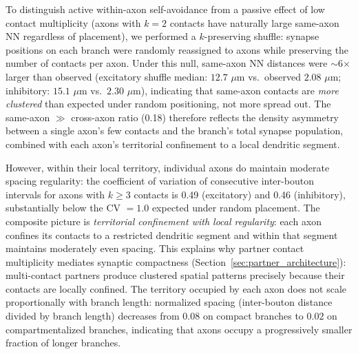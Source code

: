\documentclass[11pt]{article}
\begin{document}
To distinguish active within-axon self-avoidance from a passive effect of low contact multiplicity (axons with $k = 2$ contacts have naturally large same-axon NN regardless of placement), we performed a $k$-preserving shuffle: synapse positions on each branch were randomly reassigned to axons while preserving the number of contacts per axon. Under this null, same-axon NN distances were $\sim$6$\times$ larger than observed (excitatory shuffle median: $12.7$ $\mu$m vs.\ observed $2.08$ $\mu$m; inhibitory: $15.1$ $\mu$m vs.\ $2.30$ $\mu$m), indicating that same-axon contacts are \textit{more clustered} than expected under random positioning, not more spread out. The same-axon $\gg$ cross-axon ratio (0.18) therefore reflects the density asymmetry between a single axon's few contacts and the branch's total synapse population, combined with each axon's territorial confinement to a local dendritic segment.

However, within their local territory, individual axons do maintain moderate spacing regularity: the coefficient of variation of consecutive inter-bouton intervals for axons with $k \geq 3$ contacts is 0.49 (excitatory) and 0.46 (inhibitory), substantially below the CV $= 1.0$ expected under random placement. The composite picture is \textit{territorial confinement with local regularity}: each axon confines its contacts to a restricted dendritic segment and within that segment maintains moderately even spacing. This explains why partner contact multiplicity mediates synaptic compactness (Section~\ref{sec:partner_architecture}): multi-contact partners produce clustered spatial patterns precisely because their contacts are locally confined. The territory occupied by each axon does not scale proportionally with branch length: normalized spacing (inter-bouton distance divided by branch length) decreases from $0.08$ on compact branches to $0.02$ on compartmentalized branches, indicating that axons occupy a progressively smaller fraction of longer branches.
\end{document}
